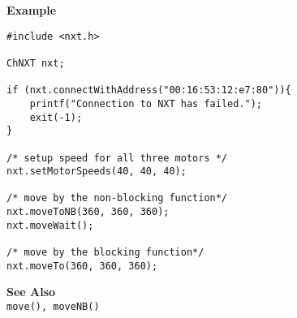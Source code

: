 \noindent
{\bf Example}
\begin{lstlisting}
#include <nxt.h> 

ChNXT nxt;

if (nxt.connectWithAddress("00:16:53:12:e7:80")){
    printf("Connection to NXT has failed.");
    exit(-1);
}
 
/* setup speed for all three motors */
nxt.setMotorSpeeds(40, 40, 40);

/* move by the non-blocking function*/
nxt.moveToNB(360, 360, 360);
nxt.moveWait();

/* move by the blocking function*/
nxt.moveTo(360, 360, 360);
\end{lstlisting}

\noindent
{\bf See Also}\\
{\tt move(), moveNB()}\\
